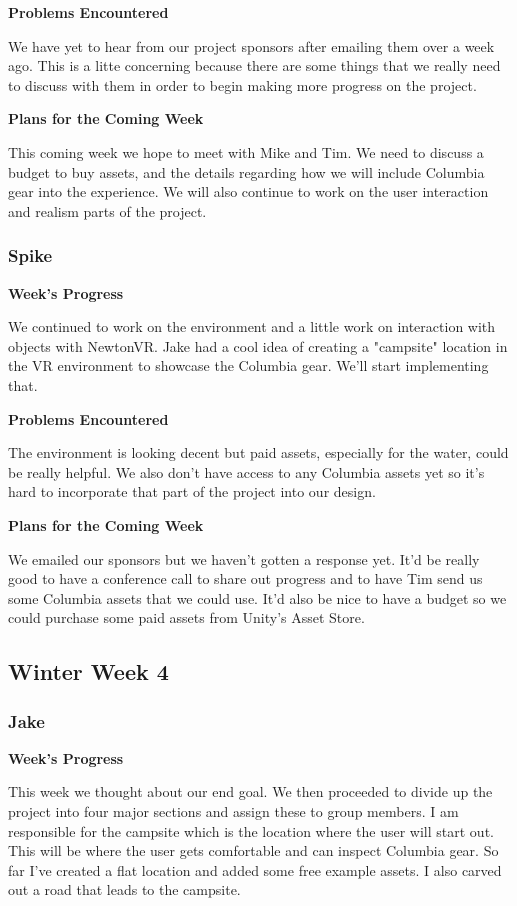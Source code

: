 \documentclass[10pt,journal,compsoc,onecolumn, draftclsnofoot]{IEEEtran}
\begin{document}
\noindent \textbf{Problems Encountered}

We have yet to hear from our project sponsors after emailing them over a week ago. This is a litte concerning because there are some things that we really need to discuss with them in order to begin making more progress on the project.

\noindent \textbf{Plans for the Coming Week}

This coming week we hope to meet with Mike and Tim. We need to discuss a budget to buy assets, and the details regarding how we will include Columbia gear into the experience. We will also continue to work on the user interaction and realism parts of the project.

\subsubsection{Spike}
\noindent \textbf{Week's Progress}

We continued to work on the environment and a little work on interaction with objects with NewtonVR. Jake had a cool idea of creating a "campsite" location in the VR environment to showcase the Columbia gear. We'll start implementing that.

\noindent \textbf{Problems Encountered}

The environment is looking decent but paid assets, especially for the water, could be really helpful. We also don't have access to any Columbia assets yet so it's hard to incorporate that part of the project into our design.

\noindent \textbf{Plans for the Coming Week}

We emailed our sponsors but we haven't gotten a response yet. It'd be really good to have a conference call to share out progress and to have Tim send us some Columbia assets that we could use. It'd also be nice to have a budget so we could purchase some paid assets from Unity's Asset Store.

\subsection{Winter Week 4}
\subsubsection{Jake}
\noindent \textbf{Week's Progress}

This week we thought about our end goal. We then proceeded to divide up the project into four major sections and assign these to group members. I am responsible for the campsite which is the location where the user will start out. This will be where the user gets comfortable and can inspect Columbia gear. So far I've created a flat location and added some free example assets. I also carved out a road that leads to the campsite.
\end{document}
